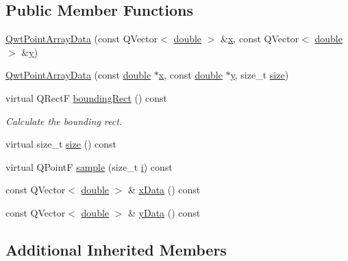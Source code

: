 \subsection*{Public Member Functions}
\begin{DoxyCompactItemize}
\item 
\hyperlink{class_qwt_point_array_data_a33044621333635f861b3945faf29cdc1}{Qwt\-Point\-Array\-Data} (const Q\-Vector$<$ \hyperlink{_super_l_u_support_8h_a8956b2b9f49bf918deed98379d159ca7}{double} $>$ \&\hyperlink{glext_8h_a1db9d104e3c2128177f26aff7b46982f}{x}, const Q\-Vector$<$ \hyperlink{_super_l_u_support_8h_a8956b2b9f49bf918deed98379d159ca7}{double} $>$ \&\hyperlink{glext_8h_a42315f3ed8fff752bb47fd782309fcfc}{y})
\item 
\hyperlink{class_qwt_point_array_data_ad83a51f37e5d626b60695baf3f0fd6fd}{Qwt\-Point\-Array\-Data} (const \hyperlink{_super_l_u_support_8h_a8956b2b9f49bf918deed98379d159ca7}{double} $\ast$\hyperlink{glext_8h_a1db9d104e3c2128177f26aff7b46982f}{x}, const \hyperlink{_super_l_u_support_8h_a8956b2b9f49bf918deed98379d159ca7}{double} $\ast$\hyperlink{glext_8h_a42315f3ed8fff752bb47fd782309fcfc}{y}, size\-\_\-t \hyperlink{glext_8h_a014d89bd76f74ef3a29c8f04b473eb76}{size})
\item 
virtual Q\-Rect\-F \hyperlink{class_qwt_point_array_data_a2d8b421115ba860e9d12a2266eeaef3b}{bounding\-Rect} () const 
\begin{DoxyCompactList}\small\item\em Calculate the bounding rect. \end{DoxyCompactList}\item 
virtual size\-\_\-t \hyperlink{class_qwt_point_array_data_a2222b2ad6346dc6357a412fc50ec8f56}{size} () const 
\item 
virtual Q\-Point\-F \hyperlink{class_qwt_point_array_data_ad2fa2b92a88d216fb4a74cb4b6ccbb9f}{sample} (size\-\_\-t \hyperlink{uavobjecttemplate_8m_a6f6ccfcf58b31cb6412107d9d5281426}{i}) const 
\item 
const Q\-Vector$<$ \hyperlink{_super_l_u_support_8h_a8956b2b9f49bf918deed98379d159ca7}{double} $>$ \& \hyperlink{class_qwt_point_array_data_a94db4f8c1d2a4495f22144d03255bc2d}{x\-Data} () const 
\item 
const Q\-Vector$<$ \hyperlink{_super_l_u_support_8h_a8956b2b9f49bf918deed98379d159ca7}{double} $>$ \& \hyperlink{class_qwt_point_array_data_ac7fcf7f7dfa58298bb165142d81d03f2}{y\-Data} () const 
\end{DoxyCompactItemize}
\subsection*{Additional Inherited Members}


